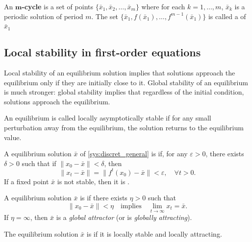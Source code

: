 \begin{definition}
An $\mathbf{m}$\textbf{-cycle} is a set of points $\{\bar x _1, \bar x_2, \dots , \bar x_m\}$ where for each $k=1,\dots,m$, $\bar x_k$ is a periodic solution of period $m$. The set $\{\bar x_1, f(\bar x_1), \dots , f^{m-1}(\bar x_1) \}$ is called a  of $\bar x_1$
\end{definition}



\subsection{Local stability in first-order equations}
Local stability of an equilibrium solution implies that solutions approach the equilibrium only if they are initially close to it. Global stability of an equilibrium is much stronger: global stability implies that regardless of the initial condition, solutions approach the equilibrium.

An equilibrium is called locally asymptotically stable if for any small perturbation away from the equilibrium, the solution returns to the equilibrium value.

\begin{definition}
A equilibrium solution $\bar x$ of \eqref{sys:discret_general} is  if, for any  $\varepsilon>0$, there exists $\delta>0$ such that if $\|x_0-\bar x\|<\delta$, then
\[
\|x_t- \bar x\|=\|f^t(x_0)-\bar x\|<\varepsilon, \quad \forall t>0.
\]
If a fixed point $\bar x$ is not stable, then it is .
\end{definition}


\begin{definition}
A equilibrium solution $\bar x$ is  if there exists $\eta>0$ such that
\[
\|x_0-\bar x\|<\eta\quad\textrm{implies}\quad \lim_{t\to\infty}x_t=\bar x.
\]
If $\eta=\infty$, then $\bar x$ is a \emph{global attractor} (or is \emph{globally attracting}).
\end{definition}

\begin{definition}
The equilibrium solution $\bar x$ is  if it is locally stable and locally attracting.
\end{definition}

